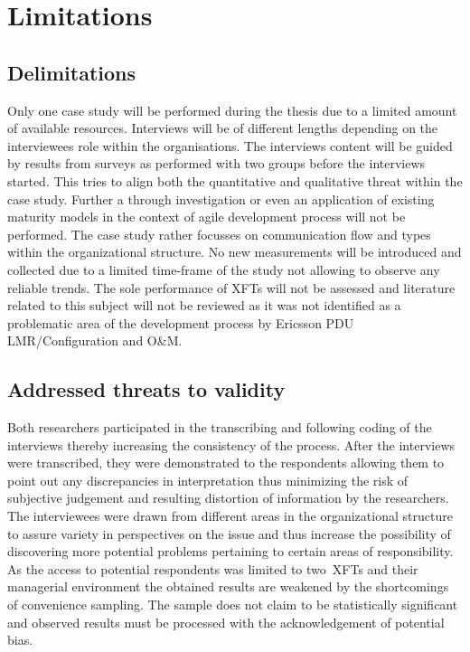 \chapter{Limitations}

\section{Delimitations}

Only one case study will be performed during the thesis due to a limited amount of available resources. Interviews will be of different lengths depending on the interviewees role within the organisations. The interviews content will be guided by results from surveys as performed with two groups before the interviews started. This tries to align both the quantitative and qualitative threat within the case study. 
Further a through investigation or even an application of existing maturity models in the context of agile development process will not be performed. The case study rather focusses on communication flow and types within the organizational structure. No new measurements will be introduced and collected due to a limited time-frame of the study not allowing to observe any reliable trends. The sole performance of \ac{XFT}s will not be assessed and literature related to this subject will not be reviewed as it was not identified as a problematic area of the development process by Ericsson PDU LMR/Configuration and O\&M.

\section{Addressed threats to validity}

Both researchers participated in the transcribing and following coding of the interviews thereby increasing the consistency of the process. After the interviews were transcribed, they were demonstrated to the respondents allowing them to point out any discrepancies in interpretation thus minimizing the risk of subjective judgement and resulting distortion of information by the researchers.
The interviewees were drawn from different areas in the organizational structure to assure variety in perspectives on the issue and thus increase the possibility of discovering more potential problems pertaining to certain areas of responsibility. As the access to potential respondents was limited to two~\ac{XFT}s and their managerial environment the obtained results are weakened by the shortcomings of convenience sampling. The sample does not claim to be statistically significant and observed results must be processed with the acknowledgement of potential bias.



